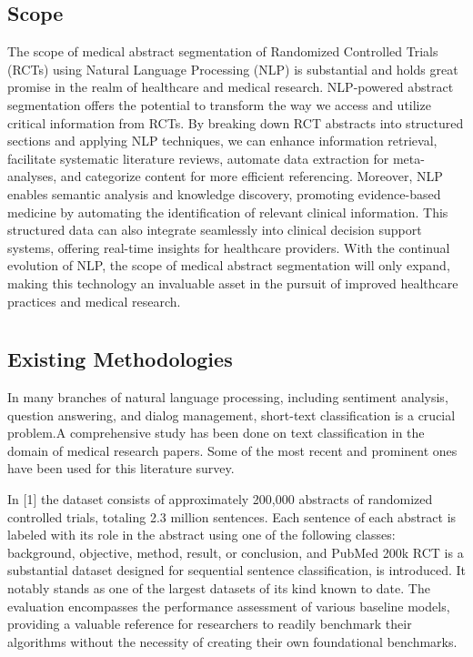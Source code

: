 \documentclass[12pt,a4paper]{report}     %
\begin{document}
\begin{normalsize}
\section {Scope}
{\setlength{\baselineskip}{1.1\baselineskip}
The scope of medical abstract segmentation of Randomized Controlled Trials (RCTs) using Natural Language Processing (NLP) is substantial and holds great promise in the realm of healthcare and medical research. NLP-powered abstract segmentation offers the potential to transform the way we access and utilize critical information from RCTs. By breaking down RCT abstracts into structured sections and applying NLP techniques, we can enhance information retrieval, facilitate systematic literature reviews, automate data extraction for meta-analyses, and categorize content for more efficient referencing. Moreover, NLP enables semantic analysis and knowledge discovery, promoting evidence-based medicine by automating the identification of relevant clinical information. This structured data can also integrate seamlessly into clinical decision support systems, offering real-time insights for healthcare providers. With the continual evolution of NLP, the scope of medical abstract segmentation will only expand, making this technology an invaluable asset in the pursuit of improved healthcare practices and medical research.
}


\newpage 
\chapter{}
{\setlength{\baselineskip}{1.1\baselineskip}
\section{Existing Methodologies}
In many branches of natural language processing, including sentiment analysis, question answering, and dialog management, short-text classification is a crucial problem.A comprehensive study has been done on text classification in the domain of medical research papers. Some of the most recent and prominent ones have been used for this literature survey. 

In [1] the dataset consists of approximately 200,000 abstracts of randomized controlled trials, totaling 2.3 million sentences. Each sentence of each abstract is labeled with its role in the abstract using one of the following classes: background, objective, method, result, or conclusion, and PubMed 200k RCT is a substantial dataset designed for sequential sentence classification, is introduced. It notably stands as one of the largest datasets of its kind known to date. The evaluation encompasses the performance assessment of various baseline models, providing a valuable reference for researchers to readily benchmark their algorithms without the necessity of creating their own foundational benchmarks.

}
\end{normalsize}
\end{document}
